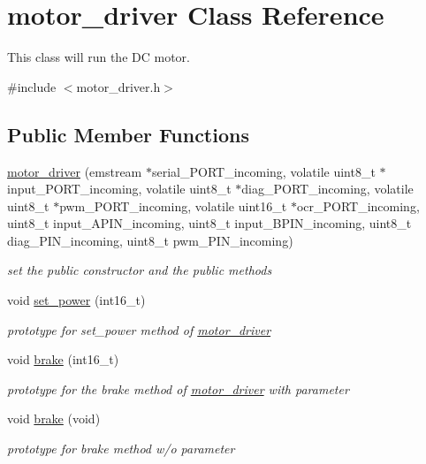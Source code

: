 \hypertarget{classmotor__driver}{\section{motor\-\_\-driver Class Reference}
\label{classmotor__driver}
}


This class will run the D\-C motor.  




{\ttfamily \#include $<$motor\-\_\-driver.\-h$>$}

\subsection*{Public Member Functions}
\begin{DoxyCompactItemize}
\item 
\hyperlink{classmotor__driver_a2c184d7e66a7935c0347d72b44d37c62}{motor\-\_\-driver} (emstream $\ast$serial\-\_\-\-P\-O\-R\-T\-\_\-incoming, volatile uint8\-\_\-t $\ast$input\-\_\-\-P\-O\-R\-T\-\_\-incoming, volatile uint8\-\_\-t $\ast$diag\-\_\-\-P\-O\-R\-T\-\_\-incoming, volatile uint8\-\_\-t $\ast$pwm\-\_\-\-P\-O\-R\-T\-\_\-incoming, volatile uint16\-\_\-t $\ast$ocr\-\_\-\-P\-O\-R\-T\-\_\-incoming, uint8\-\_\-t input\-\_\-\-A\-P\-I\-N\-\_\-incoming, uint8\-\_\-t input\-\_\-\-B\-P\-I\-N\-\_\-incoming, uint8\-\_\-t diag\-\_\-\-P\-I\-N\-\_\-incoming, uint8\-\_\-t pwm\-\_\-\-P\-I\-N\-\_\-incoming)
\begin{DoxyCompactList}\small\item\em set the public constructor and the public methods \end{DoxyCompactList}\item 
void \hyperlink{classmotor__driver_a2bc43c500da3297a815c5958bee57f20}{set\-\_\-power} (int16\-\_\-t)
\begin{DoxyCompactList}\small\item\em prototype for set\-\_\-power method of \hyperlink{classmotor__driver}{motor\-\_\-driver} \end{DoxyCompactList}\item 
void \hyperlink{classmotor__driver_a0ceae2119e7bc1a03f409ca9c0cce32c}{brake} (int16\-\_\-t)
\begin{DoxyCompactList}\small\item\em prototype for the brake method of \hyperlink{classmotor__driver}{motor\-\_\-driver} with parameter \end{DoxyCompactList}\item 
void \hyperlink{classmotor__driver_aa21e7894053cd83968d9e6b2958c9aec}{brake} (void)
\begin{DoxyCompactList}\small\item\em prototype for brake method w/o parameter \end{DoxyCompactList}\end{DoxyCompactItemize}
